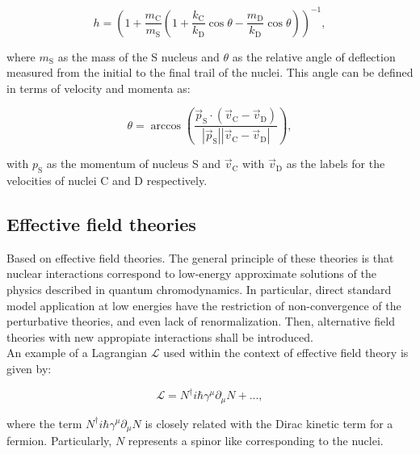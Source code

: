 \documentclass[openany]{book}
\begin{document}
\begin{equation}\label{eq:special_THM_hParameter}
	 h = \left( 1 + \frac{m_\mathrm{C}}{m_\mathrm{S}} \left( 1 + \frac{k_\mathrm{C}}{k_\mathrm{D}} \cos \theta - \frac{m_\mathrm{D}}{k_\mathrm{D}} \cos \theta \right) \right)^{-1},
\end{equation}

where $m_\mathrm{S}$ as the mass of the S nucleus and $\theta$ as the relative angle of deflection measured from the initial to the final trail of the nuclei. This angle can be defined in terms of velocity and momenta as: 

\begin{equation}\label{eq:special_THM_angle}
	\theta = \arccos {\left( \frac{\vec p_\mathrm{S} \cdot (\vec v_\mathrm{C} - \vec v_\mathrm{D})}{|\vec p_\mathrm{S}| |\vec v_\mathrm{C} - \vec v_\mathrm{D}|} \right)},
\end{equation}

with $p_\mathrm{S}$ as the momentum of nucleus S and $\vec v_\mathrm{C}$ with  $\vec v_\mathrm{D}$ as the labels for the velocities of nuclei C and D respectively. 

\subsection{Effective field theories} \label{sub:special_effectiveField}

Based on effective field theories. The general principle of these theories is that nuclear interactions correspond to low-energy approximate solutions of the physics described in quantum chromodynamics. In particular, direct standard model application at low energies have the restriction of non-convergence of the perturbative theories, and even lack of renormalization. Then, alternative field theories with new appropiate interactions shall be introduced. \\

An example of a Lagrangian $\mathcal{L}$ used within the context of effective field theory is given by: 

\begin{equation} \label{eq:micro_lagrangian_nucleons}
	\mathcal{L} = N^{\dagger}i\hbar\gamma^\mu\partial_\mu N + ... ,
\end{equation}

where the term $ N^{\dagger}i\hbar\gamma^\mu\partial_\mu N$ is closely related with the Dirac kinetic term for a fermion. Particularly, $N$ represents a spinor like corresponding to the nuclei. \\
\end{document}
